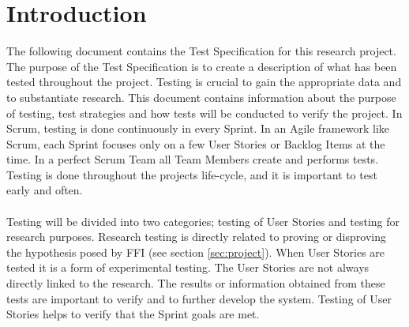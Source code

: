 \chapter{Introduction}
The following document contains the Test Specification for this research project. The purpose of the Test Specification is to create a description of what has been tested throughout the project. Testing is crucial to gain the appropriate data and to substantiate research. This document contains information about the purpose of testing, test strategies and how tests will be conducted to verify the project. In Scrum, testing is done continuously in every Sprint. In an Agile framework like Scrum, each Sprint focuses only on a few User Stories or Backlog Items at the time. In a perfect Scrum Team all Team Members create and performs tests. Testing is done throughout the projects life-cycle, and it is important to test early and often.\\
\\
Testing will be divided into two categories; testing of User Stories and testing for research purposes. Research testing is directly related to proving or disproving the hypothesis posed by FFI (see section \ref{sec:project}). When User Stories are tested it is a form of experimental testing. The User Stories are not always directly linked to the research. The results or information obtained from these tests are important to verify and to further develop the system. Testing of User Stories helps to verify that the Sprint goals are met. \\
\\
\newpage